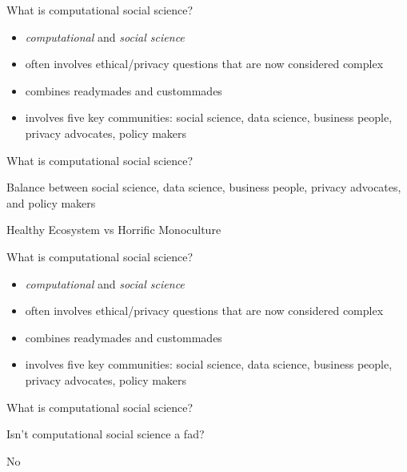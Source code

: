\documentclass{beamer}
\def\vf{\vfill}
\begin{document}
\begin{frame}{What is computational social science?}

\begin{itemize}
\item \emph{computational} and \emph{social science}
\item often involves ethical/privacy questions that are now considered complex
\item combines readymades and custommades
\item involves five key communities: social science, data science, business people, privacy advocates, policy makers
\end{itemize}

\end{frame}
\begin{frame}{What is computational social science?}

\begin{center}
Balance between social science, data science, business people, privacy advocates, and policy makers\\
\end{center}
\vf
\begin{center}
Healthy Ecosystem vs Horrific Monoculture
\end{center}

\end{frame}
\begin{frame}{What is computational social science?}


\begin{itemize}
\item \emph{computational} and \emph{social science}
\item often involves ethical/privacy questions that are now considered complex
\item combines readymades and custommades
\item involves five key communities: social science, data science, business people, privacy advocates, policy makers
\end{itemize}

\end{frame}
\begin{frame}{What is computational social science?}

\begin{center}
\LARGE{Isn't computational social science a fad?}
\end{center}

\pause
\begin{center}
	No
\end{center}


\end{frame}
\end{document}
